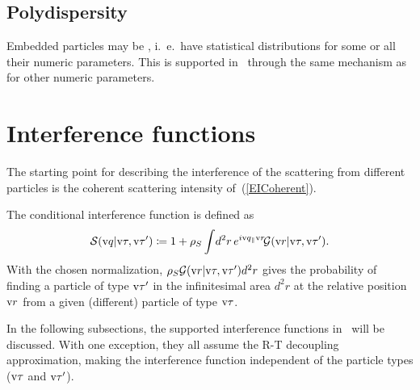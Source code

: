 
\subsection{Polydispersity}

%
%
%
%
Embedded particles may be , i.~e.\ have statistical distributions
for some or all their numeric parameters.
This is supported in \BornAgain\ through the same mechanism
as for other numeric parameters.




\section{Interference functions}

The starting point for describing the interference of the scattering from different
particles is the coherent scattering intensity of~(\ref{EICoherent}).

The conditional interference function is defined as
\begin{equation}
  \mathcal{S}(\text{v}{q} |\text{v}\tau,\text{v}\tau') \coloneqq 1 + \rho_S \int\! d^2r\, e^{i\text{v}{q}_\parallel\text{v}{r}}\! \mathcal{G}(\text{v}{r}|\text{v}\tau,\text{v}\tau').
\end{equation}
With the chosen normalization, $\rho_S \mathcal{G}(\text{v}{r}|\text{v}\tau,\text{v}\tau') d^2r$ gives the probability of
finding a particle of type $\text{v}\tau'$ in the infinitesimal area $d^2r$ at the relative position $\text{v}{r}$ from
a given (different) particle of type $\text{v}\tau$.

In the following subsections, the supported interference functions in \BornAgain\ will be discussed.
With one exception, they all assume the R-T decoupling approximation, making the interference function
independent of the particle types ($\text{v}\tau$ and $\text{v}\tau'$).

